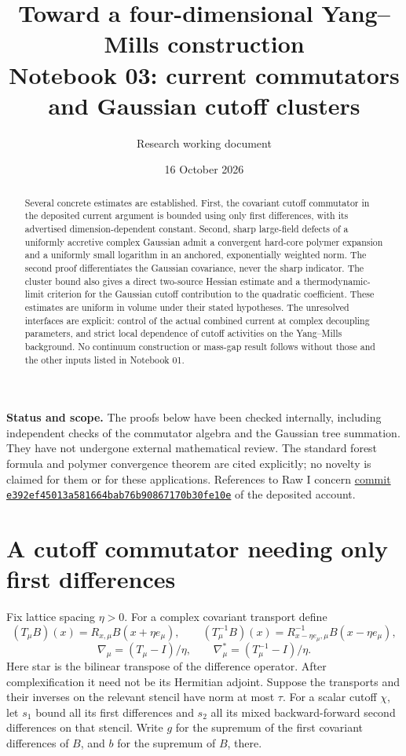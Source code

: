 \documentclass[11pt]{article}
\title{Toward a four-dimensional Yang--Mills construction\\
\large Notebook 03: current commutators and Gaussian cutoff clusters}
\author{Research working document}
\date{16 October 2026}
\theoremstyle{remark}
\begin{document}
\maketitle

\begin{abstract}
Several concrete estimates are established. First, the covariant cutoff
commutator in the deposited current argument is bounded using only
first differences, with its advertised dimension-dependent constant.
Second, sharp large-field defects of a uniformly accretive complex
Gaussian admit a convergent hard-core polymer expansion and a uniformly
small logarithm in an anchored, exponentially weighted norm. The second
proof differentiates the Gaussian covariance, never the sharp indicator.
The cluster bound also gives a direct two-source Hessian estimate and
a thermodynamic-limit criterion for the Gaussian cutoff contribution
to the quadratic coefficient. These estimates are uniform in volume
under their stated hypotheses.
The unresolved interfaces are explicit: control of the actual combined
current at complex decoupling parameters, and strict local dependence of
cutoff activities on the Yang--Mills background. No continuum construction
or mass-gap result follows without those and the other inputs listed in
Notebook 01.
\end{abstract}

\noindent\textbf{Status and scope.}
The proofs below have been checked internally, including independent
checks of the commutator algebra and the Gaussian tree summation. They
have not undergone external mathematical review. The standard forest
formula and polymer convergence theorem are cited explicitly; no novelty
is claimed for them or for these applications. References to Raw I concern
\href{https://github.com/ethanwsussman/Yang--Mills-LLM-experiment/tree/e392ef45013a581664bab76b90867170b30fe10e}
{commit \texttt{e392ef45013a581664bab76b90867170b30fe10e}}
of the deposited account.

\section{A cutoff commutator needing only first differences}

Fix lattice spacing $\eta>0$. For a complex covariant transport define
\[
 (T_\mu B)(x)=R_{x,\mu}B(x+\eta e_\mu),\qquad
 (T_\mu^{-1}B)(x)=R_{x-\eta e_\mu,\mu}^{-1}B(x-\eta e_\mu),
\]
\[
 \nabla_\mu=(T_\mu-I)/\eta,\qquad
 \nabla_\mu^*=(T_\mu^{-1}-I)/\eta.
\]
Here star is the bilinear transpose of the difference operator. After
complexification it need not be its Hermitian adjoint. Suppose the
transports and their inverses on the relevant stencil have norm at most
$\tau$. For a scalar cutoff $\chi$, let $s_1$ bound all its first
differences and $s_2$ all its mixed backward-forward second differences
on that stencil. Write $g$ for the supremum of the first covariant
differences of $B$, and $b$ for the supremum of $B$, there.
\end{document}
